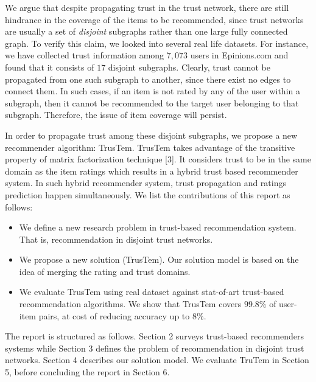 \documentclass[11pt, conference, onecolumn]{IEEEtran}
\begin{document}
We argue that despite propagating trust in the trust network, there are still hindrance in the coverage of the items to be recommended, since trust networks are usually a set of \textit{disjoint} subgraphs rather than one large fully connected graph. To verify this claim, we looked into several real life datasets. For instance, we have collected trust information among $7,073$ users in Epinions.com and found that it consists of $17$ disjoint subgraphs. Clearly, trust cannot be propagated from one such subgraph to another, since there exist no edges to connect them. In such cases, if an item is not rated by any of the user within a subgraph, then it cannot be recommended to the target user belonging to that subgraph. Therefore, the issue of item coverage will persist.

In order to propagate trust among these disjoint subgraphs, we propose a new recommender algorithm: TrusTem. TrusTem takes advantage of the transitive property of matrix factorization technique [3]. It considers trust to be in the same domain as the item ratings which results in a hybrid trust based recommender system. In such hybrid recommender system, trust propagation and ratings prediction happen simultaneously. We list the contributions of this report as follows:
\begin{itemize}
\item We define a new research problem in trust-based recommendation system. That is, recommendation in disjoint trust networks.
\item We propose a new solution (TrusTem). Our solution model is based on the idea of merging the rating and trust domains.
\item We evaluate TrusTem using real dataset against stat-of-art trust-based recommendation algorithms. We show that TrusTem covers $99.8\%$ of user-item pairs, at cost of reducing accuracy up to $8\%$.
\end{itemize}

The report is structured as follows. Section 2 surveys trust-based recommenders systems while Section 3 defines the problem of recommendation in disjoint trust networks. Section 4 describes our solution model. We evaluate TruTem in Section 5, before concluding the report in Section 6.
\end{document}

